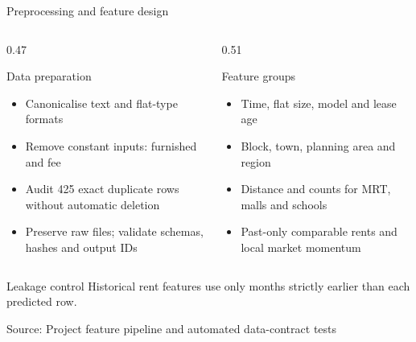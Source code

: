\documentclass[xcolor=dvipsnames,aspectratio=43]{beamer}
\newcommand{\source}[1]{%
  \vfill\par\begingroup\raggedright\tiny\color{gray}Source: #1\par\endgroup
}
\begin{document}
\begin{frame}{Preprocessing and feature design}
\small
\begin{columns}[T,totalwidth=\textwidth]
  \begin{column}{0.47\textwidth}
    \begin{block}{Data preparation}
      \begin{itemize}
        \item Canonicalise text and flat-type formats
        \item Remove constant inputs: furnished and fee
        \item Audit 425 exact duplicate rows without automatic deletion
        \item Preserve raw files; validate schemas, hashes and output IDs
      \end{itemize}
    \end{block}
  \end{column}
  \begin{column}{0.51\textwidth}
    \begin{block}{Feature groups}
      \begin{itemize}
        \item Time, flat size, model and lease age
        \item Block, town, planning area and region
        \item Distance and counts for MRT, malls and schools
        \item Past-only comparable rents and local market momentum
      \end{itemize}
    \end{block}
  \end{column}
\end{columns}
\begin{alertblock}{Leakage control}
  Historical rent features use only months strictly earlier than each predicted row.
\end{alertblock}
\source{Project feature pipeline and automated data-contract tests}
\end{frame}
\end{document}
